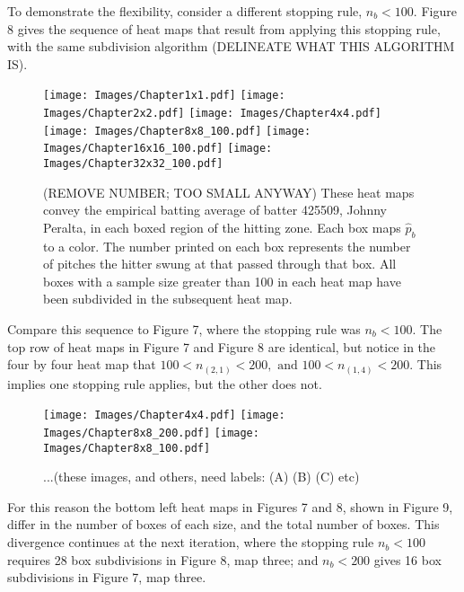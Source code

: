 To demonstrate the flexibility, consider a different stopping rule, $n_{b} < 100$. Figure 8 gives the sequence of heat maps that result from applying this stopping rule, with the same subdivision algorithm (DELINEATE WHAT THIS ALGORITHM IS). 
        \begin{figure}[H]
      	\centering
      	\texttt{[image: Images/Chapter1x1.pdf]}
      	\texttt{[image: Images/Chapter2x2.pdf]}
      	\texttt{[image: Images/Chapter4x4.pdf]}
      	\texttt{[image: Images/Chapter8x8\_100.pdf]}
      	\texttt{[image: Images/Chapter16x16\_100.pdf]}
      	\texttt{[image: Images/Chapter32x32\_100.pdf]}
      	\caption{(REMOVE NUMBER; TOO SMALL ANYWAY) These heat maps convey the empirical batting average of batter 425509, Johnny Peralta, in each boxed region of the hitting zone. Each box maps $\hat{p}_{b}$ to a color. The number printed on each box represents the number of pitches the hitter swung at that passed through that box. All boxes with a sample size greater than 100 in each heat map have been subdivided in the subsequent heat map.}
\end{figure} 	
Compare this sequence to Figure 7, where the stopping rule was $n_{b} < 100$. The top row of heat maps in Figure 7 and Figure 8 are identical, but notice in the four by four heat map that $100 < n_{(2,1)} < 200, \text{ and } 100 < n_{(1,4)} < 200$. This implies one stopping rule applies, but the other does not.
        \begin{figure}[H]
      	\centering      
      	\texttt{[image: Images/Chapter4x4.pdf]}
      	\texttt{[image: Images/Chapter8x8\_200.pdf]}
      	\texttt{[image: Images/Chapter8x8\_100.pdf]}
      	\caption{...(these images, and others, need labels: (A) (B) (C) etc)}
\end{figure} 
For this reason the bottom left heat maps in Figures 7 and 8, shown in Figure 9, differ in the number of boxes of each size, and the total number of boxes. This divergence continues at the next iteration, where the stopping rule $n_{b} < 100$ requires 28 box subdivisions in Figure 8, map three; and $n_{b} < 200$ gives 16 box subdivisions in Figure 7, map three.




% 
% 
% 
% 